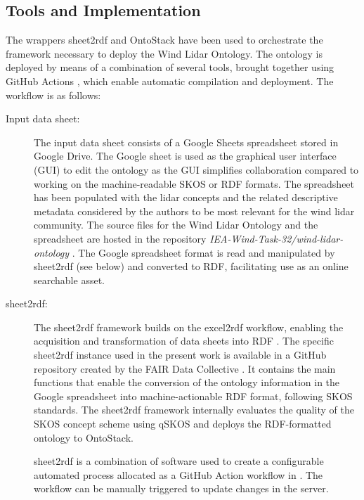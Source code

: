 \documentclass[remotesensing,article,submit,pdftex,moreauthors]{Definitions/mdpi}
\begin{document}
\subsection{Tools and Implementation}
\label{subsec:implementation}
The wrappers sheet2rdf \cite{ref-Fiorelli2015, nikola_vasiljevic_2021_4432136} and OntoStack \cite{ref-OntoStack} have been used to orchestrate the framework necessary to deploy the Wind Lidar Ontology. The ontology is deployed by means of a combination of several tools, brought together using GitHub Actions \cite{ref-GitActions}, which enable automatic compilation and deployment. The workflow is as follows: 
\begin{description}
    
    \item [Input data sheet:] The input data sheet consists of a Google Sheets spreadsheet stored in Google Drive. The Google sheet is used as the graphical user interface (GUI) to edit the ontology as the GUI simplifies collaboration compared to working on the machine-readable SKOS or RDF formats. The spreadsheet has been populated with the lidar concepts and the related descriptive metadata considered by the authors to be most relevant for the wind lidar community. The source files for the Wind Lidar Ontology and the spreadsheet are hosted in the repository  \textit{IEA-Wind-Task-32/wind-lidar-ontology} \cite{TCP32_GitHub_repo}.
    The Google spreadsheet format is read and manipulated by sheet2rdf (see below) and converted to RDF, facilitating use as an online searchable asset. 
    
    \item [sheet2rdf:] The sheet2rdf \cite{ref-Fiorelli2015, nikola_vasiljevic_2021_4432136} framework builds on the excel2rdf \cite{ref-excel2rdf} workflow, enabling the acquisition and transformation of data sheets into RDF \cite{ref-github-sheet2rdf}. The specific sheet2rdf instance used in the present work is available in a GitHub repository created by the FAIR Data Collective \cite{ref-FAIRsheet2rdf}. It contains the main functions that enable the conversion of the ontology information in the Google spreadsheet into machine-actionable RDF format, following SKOS standards. The sheet2rdf framework internally evaluates the quality of the SKOS concept scheme using qSKOS \cite{ref-W3C-qSKOS} and deploys the RDF-formatted ontology to OntoStack. 
    
    sheet2rdf is a combination of software used to create a configurable automated process allocated as a GitHub Action workflow in \cite{ref-FAIRsheet2rdf}. The workflow can be manually triggered to update changes in the server.
    

\end{description}
\end{document}

